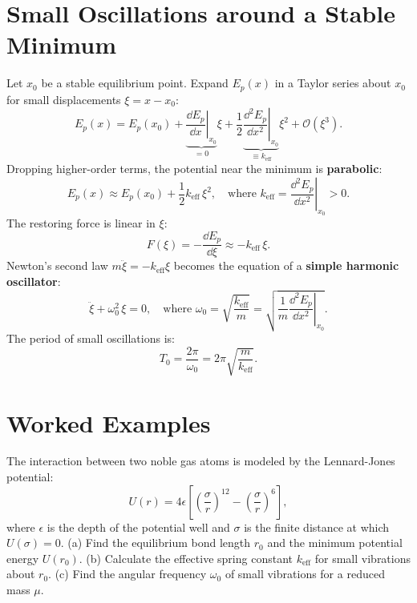 \section{Small Oscillations around a Stable Minimum}

Let $x_0$ be a stable equilibrium point. Expand $E_p(x)$ in a Taylor series about $x_0$ for small displacements $\xi = x - x_0$:
\[
E_p(x) = E_p(x_0) + \underbrace{\left.\frac{\dd E_p}{\dd x}\right|_{x_0}}_{=0}\xi + \frac{1}{2}\underbrace{\left.\frac{\dd^2 E_p}{\dd x^2}\right|_{x_0}}_{\equiv k_{\text{eff}}}\xi^2 + \mathcal{O}(\xi^3).
\]
Dropping higher-order terms, the potential near the minimum is \textbf{parabolic}:
\[
\boxed{E_p(x) \approx E_p(x_0) + \frac{1}{2}k_{\text{eff}}\,\xi^2,} \quad \text{where } \boxed{k_{\text{eff}} = \left.\frac{\dd^2 E_p}{\dd x^2}\right|_{x_0} > 0.}
\]
The restoring force is linear in $\xi$:
\[
F(\xi) = -\frac{\dd E_p}{\dd\xi} \approx -k_{\text{eff}}\,\xi.
\]
Newton's second law $m\ddot{\xi} = -k_{\text{eff}}\xi$ becomes the equation of a \textbf{simple harmonic oscillator}:
\[
\boxed{\ddot{\xi} + \omega_0^2\,\xi = 0,} \quad \text{where } \boxed{\omega_0 = \sqrt{\frac{k_{\text{eff}}}{m}} = \sqrt{\left.\frac{1}{m}\frac{\dd^2 E_p}{\dd x^2}\right|_{x_0}}.}
\]
The period of small oscillations is:
\[
\boxed{T_0 = \frac{2\pi}{\omega_0} = 2\pi\sqrt{\frac{m}{k_{\text{eff}}}}.}
\]

\section{Worked Examples}

\begin{worked}
The interaction between two noble gas atoms is modeled by the Lennard-Jones potential:
\[
U(r) = 4\epsilon\left[ \left(\frac{\sigma}{r}\right)^{12} - \left(\frac{\sigma}{r}\right)^6 \right],
\]
where $\epsilon$ is the depth of the potential well and $\sigma$ is the finite distance at which $U(\sigma) = 0$.
(a) Find the equilibrium bond length $r_0$ and the minimum potential energy $U(r_0)$.
(b) Calculate the effective spring constant $k_{\text{eff}}$ for small vibrations about $r_0$.
(c) Find the angular frequency $\omega_0$ of small vibrations for a reduced mass $\mu$.
\end{worked}

